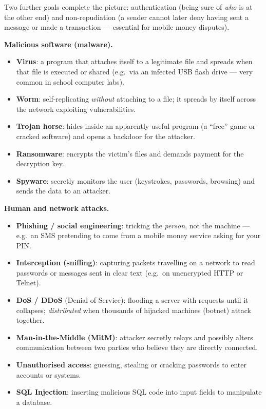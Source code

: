 \documentclass[11pt]{article}
\newcommand{\cle}[1]{{\popxbold\color{popdark}#1}}
\newcounter{popsec}
\newcounter{popsub}
\newcommand{\courssub}[1]{%
  \stepcounter{popsub}%
  \par\vspace{9pt}\noindent{\popxbold\fontsize{11.5}{13}\selectfont\color{popink}{\color{poporange}\thepopsec.\thepopsub}\hspace{6pt}#1}\par\nopagebreak\vspace{4pt}
}
\begin{document}
Two further goals complete the picture: \cle{authentication} (being sure of \emph{who} is at the other end) and \cle{non-repudiation} (a sender cannot later deny having sent a message or made a transaction --- essential for mobile money disputes).

\courssub{Threats and Attacks}

\textbf{Malicious software (malware).}\par
\begin{itemize}
\item \textbf{Virus}: a program that attaches itself to a legitimate file and spreads when that file is executed or shared (e.g.\ via an infected USB flash drive --- very common in school computer labs).
\item \textbf{Worm}: self-replicating \emph{without} attaching to a file; it spreads by itself across the network exploiting vulnerabilities.
\item \textbf{Trojan horse}: hides inside an apparently useful program (a ``free'' game or cracked software) and opens a backdoor for the attacker.
\item \textbf{Ransomware}: encrypts the victim's files and demands payment for the decryption key.
\item \textbf{Spyware}: secretly monitors the user (keystrokes, passwords, browsing) and sends the data to an attacker.
\end{itemize}

\textbf{Human and network attacks.}\par
\begin{itemize}
\item \textbf{Phishing / social engineering}: tricking the \emph{person}, not the machine --- e.g.\ an SMS pretending to come from a mobile money service asking for your PIN.
\item \textbf{Interception (sniffing)}: capturing packets travelling on a network to read passwords or messages sent in clear text (e.g.\ on unencrypted HTTP or Telnet).
\item \textbf{DoS / DDoS} (Denial of Service): flooding a server with requests until it collapses; \emph{distributed} when thousands of hijacked machines (botnet) attack together.
\item \textbf{Man-in-the-Middle (MitM)}: attacker secretly relays and possibly alters communication between two parties who believe they are directly connected.
\item \textbf{Unauthorised access}: guessing, stealing or cracking passwords to enter accounts or systems.
\item \textbf{SQL Injection}: inserting malicious SQL code into input fields to manipulate a database.
\end{itemize}
\end{document}
